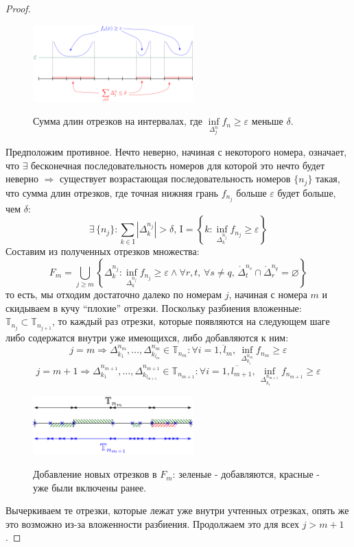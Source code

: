 \documentclass[12pt]{article}
\newcommand{\MTB}{\mathbb{T}}
\newcommand{\MI}{\mathrm{I}}
\newcommand{\VN}{\varnothing}
\newcommand{\VE}{\varepsilon}
\theoremstyle{definition}
\begin{document}
\begin{proof}

	\begin{figure}[H]
		\centering
		\includegraphics[width=0.55\textwidth]{MA3L13_2.png}
		\label{MA3L13_2}
		\caption{Сумма длин отрезков на интервалах, где $\inf\limits_{\Delta_j^n}f_n \geq \VE$ меньше $\delta$.}
		\label{fig:Сумма длин отрезков}
	\end{figure}
	Предположим противное. Нечто неверно, начиная с некоторого номера, означает, что $\exists$ бесконечная последовательность номеров для которой это нечто будет неверно $\Rightarrow$ существует возрастающая последовательность номеров $\{n_j\}$ такая, что сумма длин отрезков, где точная нижняя грань $f_{n_j}$ больше $\VE$ будет больше, чем $\delta$:
	$$
		\exists \, \{n_j\} \colon \sum\limits_{k \in \MI}|\Delta_k^{n_j}| > \delta, \, \MI = \left\{k \colon \inf\limits_{\Delta_k^{n_j}}f_{n_j} \geq \VE\right\}
	$$
	Составим из полученных отрезков множества:
	$$
		F_m = \bigcup\limits_{j \geq m}\left\{ \Delta_k^{n_j} \colon \inf\limits_{\Delta_k^{n_j}}f_{n_j}\geq \VE \wedge \forall r,t, \, \forall s \neq q, \, \mathring{\Delta}_t^{n_s} \cap \mathring{\Delta}_r^{n_q} = \VN \right\}
	$$
	то есть, мы отходим достаточно далеко по номерам $j$, начиная с номера $m$ и скидываем в кучу ``плохие'' отрезки. Поскольку разбиения вложенные: $\MTB_{n_j} \subset \MTB_{n_{j+1}}$, то каждый раз отрезки, которые появляются на следующем шаге либо содержатся внутри уже имеющихся, либо добавляются к ним:
	$$
		j = m \Rightarrow \Delta_{k_1}^{n_m}, \dotsc, \Delta_{k_{l_m}}^{n_m} \in \MTB_{n_m}	\colon \forall i = \overline{1, l_m}, \, \inf\limits_{\Delta_{k_i}^{n_m}}f_{n_m}\geq \VE
	$$
	$$
		j = m + 1 \Rightarrow \Delta_{k_1}^{n_{m+1}}, \dotsc, \Delta_{k_{l_{m+1}}}^{n_{m+1}} \in \MTB_{n_{m+1}}	\colon \forall i = \overline{1, l_{m+1}}, \, \inf\limits_{\Delta_{k_i}^{n_{m+1}}}f_{n_{m+1}}\geq \VE
	$$
	\begin{figure}[H]
		\centering
		\includegraphics[width=0.55\textwidth]{MA3L13_4.png}
		\label{MA3L13_4}
		\caption{Добавление новых отрезков в $F_m$: зеленые - добавляются, красные - уже были включены ранее.}
		\label{fig:Добавление новых отрезков}
	\end{figure}
	Вычеркиваем те отрезки, которые лежат уже внутри учтенных отрезках, опять же это возможно из-за вложенности разбиения. Продолжаем это для всех $j > m + 1$. 
	

\end{proof}
\end{document}
